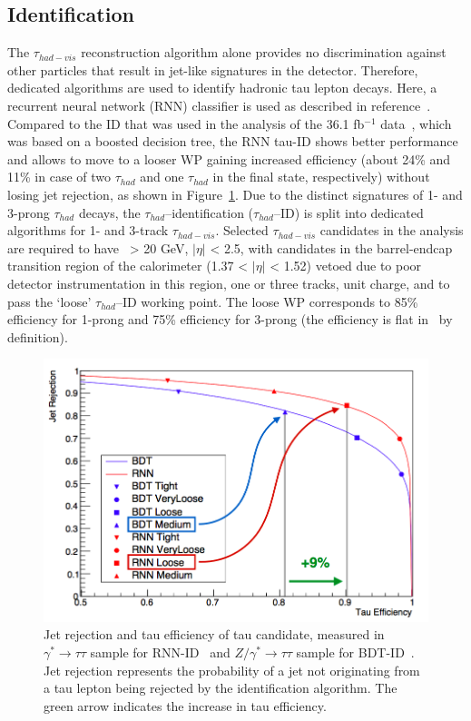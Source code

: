\subsection{Identification}
The $\tau_{had-vis}$ reconstruction algorithm alone provides 
no discrimination against other particles that result in
jet-like signatures in the detector. 
Therefore, dedicated algorithms are used to identify hadronic tau lepton
decays. Here, a recurrent neural network (RNN) classifier 
is used as described in reference~\cite{ATL-PHYS-PUB-2019-033}.
Compared to the ID that was used in the analysis of the 36.1 fb$^{-1}$ data~\cite{HIGG-2016-16},
which was based on a boosted decision tree, 
the RNN tau-ID shows better performance 
and allows to move to a looser WP gaining increased efficiency 
(about 24\% and 11\% in case of two $\tau_{had}$ and 
one $\tau_{had}$ in the final state, respectively) 
without losing jet rejection, as shown in Figure~\ref{fig:RNNtau}. 
Due to the distinct signatures of 1- and 3-prong $\tau_{had}$ decays, 
the $\tau_{had}$--identification ($\tau_{had}$--ID) is split into dedicated
algorithms for 1- and 3-track $\tau_{had-vis}$.
Selected $\tau_{had-vis}$ candidates in the analysis are required to have 
\pt\ > 20 GeV, $|\eta|$ < 2.5, with candidates in the barrel-endcap 
transition region of the calorimeter (1.37 < $|\eta|$ < 1.52) vetoed 
due to poor detector instrumentation in this region, 
one or three tracks, unit charge, and to pass the ‘loose’ $\tau_{had}$--ID working point.
The loose WP corresponds to 85\% efficiency for 1-prong 
and 75\% efficiency for 3-prong (the efficiency is
flat in \pt\ by definition).
\begin{figure}[bth]
	\begin{centering}	
	\includegraphics[width=.9\textwidth]{Reconstruction/plots/tauRNN.png}
	\caption{Jet rejection and tau efficiency of tau candidate, 
    measured in $\gamma^* \rightarrow \tau\tau$ sample for RNN-ID~\cite{ATL-PHYS-PUB-2019-033}
    and $Z/\gamma^* \rightarrow \tau\tau$ sample for BDT-ID~\cite{ATL-PHYS-PUB-2015-045}.
    Jet rejection represents the probability of a jet 
    not originating from a tau lepton being rejected 
    by the identification algorithm.
    The green arrow indicates the increase in tau efficiency.}
	\label{fig:RNNtau}
	\end{centering}
\end{figure}

